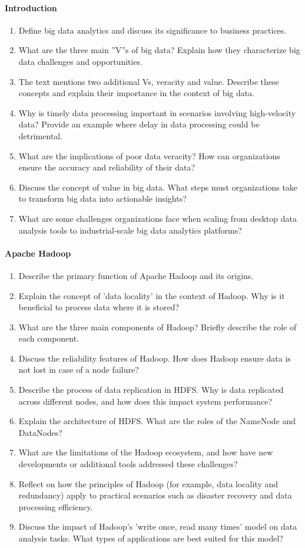 \paragraph*{Introduction}
\begin{enumerate}[nosep]
    \item Define big data analytics and discuss its significance to business practices.
    \item What are the three main ''V''s of big data? Explain how they characterize big data challenges and opportunities.
	\item The text mentions two additional Vs, veracity and value. Describe these concepts and explain their importance in the context of big data.
	\item Why is timely data processing important in scenarios involving high-velocity data? Provide an example where delay in data processing could be detrimental.
    \item What are the implications of poor data veracity? How can organizations ensure the accuracy and reliability of their data?
    \item Discuss the concept of value in big data. What steps must organizations take to transform big data into actionable insights?
	\item What are some challenges organizations face when scaling from desktop data analysis tools to industrial-scale big data analytics platforms?
\end{enumerate}
\paragraph*{Apache Hadoop}
\begin{enumerate}
	\item Describe the primary function of Apache Hadoop and its origins.
	\item Explain the concept of 'data locality' in the context of Hadoop. Why is it beneficial to process data where it is stored?
	\item What are the three main components of Hadoop? Briefly describe the role of each component.
	\item Discuss the reliability features of Hadoop. How does Hadoop ensure data is not lost in case of a node failure?
	\item Describe the process of data replication in HDFS. Why is data replicated across different nodes, and how does this impact system performance?
	\item Explain the architecture of HDFS. What are the roles of the NameNode and DataNodes?
	\item What are the limitations of the Hadoop ecosystem, and how have new developments or additional tools addressed these challenges?
	\item Reflect on how the principles of Hadoop (for example, data locality and redundancy) apply to practical scenarios such as disaster recovery and data processing efficiency.
	\item Discuss the impact of Hadoop's 'write once, read many times' model on data analysis tasks. What types of applications are best suited for this model?
\end{enumerate}

